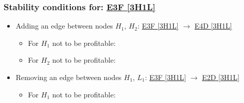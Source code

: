 

\subsubsection{Stability conditions for: \hyperref[apx:E3F:3H1L]{E3F [3H1L]}}
\label{apx:E3F:3H1L_stability_cond}

\begin{itemize}

	\item Adding an edge between nodes $H_1$, $H_2$: \hyperref[apx:E3F:3H1L]{E3F [3H1L]} $\to$ \hyperref[apx:E4D:3H1L]{E4D [3H1L]}

	\begin{itemize}

		\item For $H_1$ not to be profitable:


		\item For $H_2$ not to be profitable:


	\end{itemize}

	\item Removing an edge between nodes $H_1$, $L_1$: \hyperref[apx:E3F:3H1L]{E3F [3H1L]} $\to$ \hyperref[apx:E2D:3H1L]{E2D [3H1L]}

	\begin{itemize}

		\item For $H_1$ not to be profitable:



\end{itemize}
\end{itemize}
